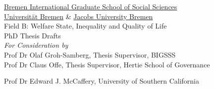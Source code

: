 \begin{titlepage}

\centering

\thispagestyle{empty}

\vspace*{\fill}

			{\Large \href{http://www.bigsss-bremen.de}{Bremen International Graduate School of Social Sciences}}\\
			{\Large \href{http://www.uni-bremen.de}{Universit\"at Bremen} \& \href{http://www.jacobs-university.de}{Jacobs University Bremen}}\\ \vspace{15pt}
			{\Large Field B: Welfare State, Inequality and Quality of Life}\\
			 \vspace{50pt} 
			{\Large PhD Thesis Drafts}\\ 	\vspace{30pt}
			{\Large \emph{For Consideration by}} \\ \vspace{30pt}
			{\large Prof Dr Olaf Groh-Samberg, Thesis Supervisor, BIGSSS}\\ 
	\vspace{10pt}
			{\large Prof Dr Claus Offe, Thesis Supervisor, Hertie School of Governance}\\
			
		\vspace{10pt}		
			
			{\large Prof Dr Edward J. McCaffery, University of Southern California}\\
			
			\vspace{30pt} 

\vspace*{\fill}
	
\end{titlepage}